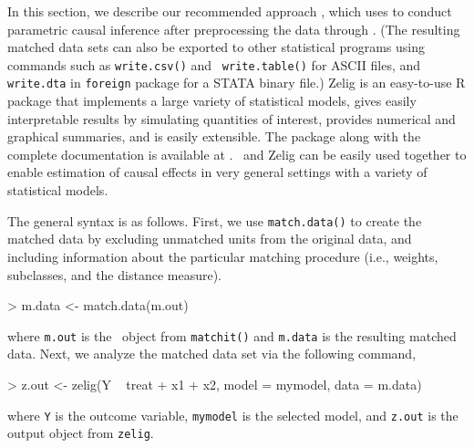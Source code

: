 

In this section, we describe our recommended approach
\citep{HoImaKin05}, which uses
 to conduct parametric
causal inference after preprocessing the data through \MatchIt.  (The
resulting matched data sets can also be exported to other statistical
programs using commands such as {\tt write.csv()} and {\tt
  write.table()} for ASCII files, and {\tt write.dta} in {\tt foreign}
package for a STATA binary file.)  Zelig \citep{ImaKinLau04} is an
easy-to-use R package that implements a large variety of statistical
models, gives easily interpretable results by simulating quantities of
interest, provides numerical and graphical summaries, and is easily
extensible.  The package along with the complete documentation is
available at
.
\MatchIt\ and Zelig can be easily used together to enable estimation
of causal effects in very general settings with a variety of
statistical models.

The general syntax is as follows. First, we use \texttt{match.data()}
to create the matched data by excluding unmatched units from the
original data, and including information about the particular matching
procedure (i.e., weights, subclasses, and the distance measure).
\begin{Schunk}
\begin{Sinput}
> m.data <- match.data(m.out)
\end{Sinput}
\end{Schunk}
where {\tt m.out} is the \MatchIt\ object from {\tt matchit()} and
{\tt m.data} is the resulting matched data.  Next, we analyze the
matched data set via the following command,
\begin{Schunk}
\begin{Sinput}
> z.out <- zelig(Y ~ treat + x1 + x2, model = mymodel, data = m.data)
\end{Sinput}
\end{Schunk}
where {\tt Y} is the outcome variable, {\tt mymodel} is the selected
model, and {\tt z.out} is the output object from {\tt zelig}.

